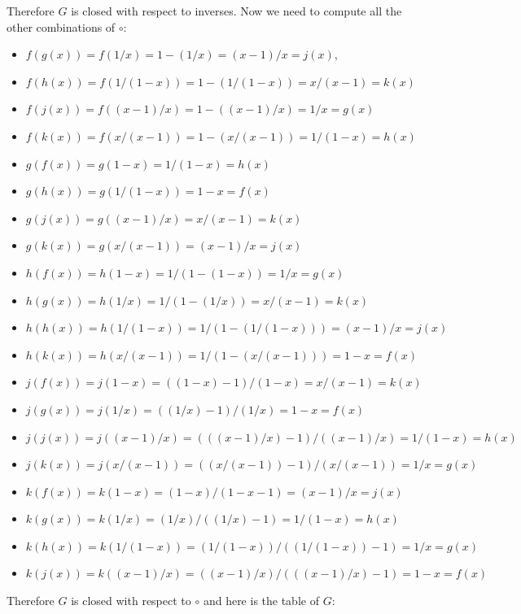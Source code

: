 \documentclass[twoside]{amsart}
\begin{document}
\begin{enumerate}[A.]
\begin{enumerate}[1]
      Therefore $G$ is closed with respect to inverses. Now we need
      to compute all the other combinations of $\circ$:     
      \begin{itemize}
         \item $f(g(x)) = f(1/x) = 1-(1/x) = (x-1)/x = j(x)$,
         \item $f(h(x)) = f(1/(1-x)) = 1-(1/(1-x)) = x/(x-1) = k(x)$
	 \item $f(j(x)) = f((x-1)/x) = 1-((x-1)/x) = 1/x = g(x)$
	 \item $f(k(x)) = f(x/(x-1)) = 1-(x/(x-1)) = 1/(1-x) = h(x)$
	 \item $g(f(x)) = g(1-x) = 1/(1-x) = h(x)$
         \item $g(h(x)) = g(1/(1-x)) = 1-x = f(x)$
	 \item $g(j(x)) = g((x-1)/x) = x/(x-1) = k(x)$
	 \item $g(k(x)) = g(x/(x-1)) = (x-1)/x = j(x)$
	 \item $h(f(x)) = h(1-x) = 1/(1-(1-x)) = 1/x = g(x)$
	 \item $h(g(x)) = h(1/x) = 1/(1-(1/x)) = x/(x-1) = k(x)$
	 \item $h(h(x)) = h(1/(1-x)) = 1/(1-(1/(1-x))) = (x-1)/x = j(x)$
	 \item $h(k(x)) = h(x/(x-1)) = 1/(1-(x/(x-1))) = 1-x = f(x)$
	 \item $j(f(x)) = j(1-x) = ((1-x)-1)/(1-x) = x/(x-1) = k(x)$
	 \item $j(g(x)) = j(1/x) = ((1/x)-1)/(1/x) = 1-x = f(x)$
	 \item $j(j(x)) = j((x-1)/x) = (((x-1)/x)-1)/((x-1)/x) = 1/(1-x)=h(x)$
	 \item $j(k(x)) = j(x/(x-1)) = ((x/(x-1))-1)/(x/(x-1)) = 1/x = g(x)$
	 \item $k(f(x)) = k(1-x) = (1-x)/(1-x-1) = (x-1)/x= j(x)$
	 \item $k(g(x)) = k(1/x) = (1/x)/((1/x)-1) = 1/(1-x) = h(x)$
	 \item $k(h(x)) = k(1/(1-x)) = (1/(1-x))/((1/(1-x))-1) = 1/x = g(x)$
	 \item $k(j(x)) = k((x-1)/x) = ((x-1)/x)/(((x-1)/x)-1) = 1-x = f(x)$
      \end{itemize}

      Therefore $G$ is closed with respect to $\circ$ and here is the
      table of $G$:


\end{enumerate}
\end{enumerate}
\end{document}
